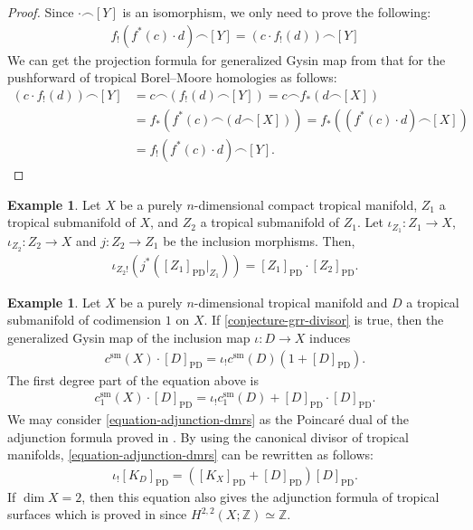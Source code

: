 \documentclass[a4paper,dvipdfmx,reqno,12pt]{amsart}
\theoremstyle{definition}
\newtheorem{example}[theorem]{Example}
\newcommand{\PD}[1]{[#1]_{\mathrm{PD}}}
\numberwithin{equation}{section}
\begin{document}
\begin{proof}
Since $\cdot \frown [Y]$ is an isomorphism, we only need
to prove the following:
\begin{align}
    f_!(f^{*}(c)\cdot d)\frown [Y]=(c\cdot f_!(d))\frown [Y]
\end{align}
We can get the projection formula for generalized Gysin
map from that for the pushforward of tropical 
Borel--Moore homologies as follows:
\begin{align}
(c\cdot f_!(d))\frown [Y]&=
c\frown(f_!(d)\frown [Y])=
c\frown f_*(d\frown [X])\\
&=f_*(f^*(c)\frown (d\frown [X]))
=f_*((f^*(c)\cdot d) \frown [X]) \\
&=f_!(f^{*}(c)\cdot d)\frown [Y].
\end{align}
\end{proof}

\begin{example}
Let $X$ be a purely $n$-dimensional compact tropical
manifold, 
$Z_1$ a tropical submanifold of $X$,
and $Z_2$ a tropical submanifold of $Z_1$.
Let $\iota_{Z_1}\colon Z_1\to X$,
$\iota_{Z_2}\colon Z_2\to X$ and
$j\colon Z_2\to Z_1$ be the inclusion
morphisms.
Then, 
\begin{align}
\iota_{Z_2 !}(j^{*}(\PD{Z_1}|_{Z_1}))
=\PD{Z_1}\cdot \PD{Z_2}.
\end{align}
\end{example}

\begin{example}
\label{example-grr-1}
Let $X$ be a purely $n$-dimensional tropical manifold
and $D$ a tropical submanifold of codimension $1$ on 
$X$. If 
\cref{conjecture-grr-divisor} is true, then
the generalized Gysin map of the
inclusion map
$\iota\colon D\to X$ induces
\begin{align}
c^{\mathrm{sm}}(X)\cdot \PD{D}=\iota_!c^{\mathrm{sm}}(D)
(1+\PD{D}).
\end{align}
The first degree part of the equation above is
\begin{align}
\label{equation-adjunction-dmrs}
c^{\mathrm{sm}}_{1}(X)\cdot \PD{D}=\iota_!c^{\mathrm{sm}}_1(D)
+\PD{D}\cdot \PD{D}.
\end{align}
We may consider \cref{equation-adjunction-dmrs} as 
the Poincar\'e dual of the adjunction formula proved in
\cite[Theorem 5.2]{demedrano2023chern}.
By using the canonical divisor of tropical manifolds,
\eqref{equation-adjunction-dmrs} can be rewritten as follows:
\begin{align}
\iota_! \PD{K_D}=(\PD{K_X}+\PD{D})\PD{D}.
\end{align}
If $\dim X=2$, then this equation also gives
the adjunction formula of tropical surfaces which is proved
in \cite[Theorem 4.11]{shaw2015tropical}
since $H^{2,2}(X;\mathbb{Z})\simeq \mathbb{Z}$.
\end{example}
\end{document}
